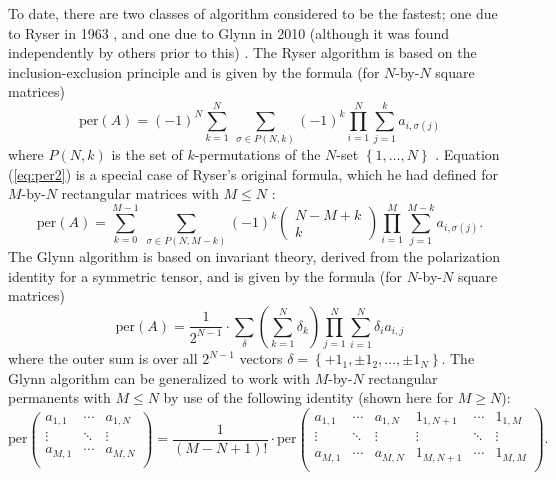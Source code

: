 \documentclass{article}
\begin{document}
To date, there are two classes of algorithm considered to be the fastest; one
due to Ryser in 1963 \cite{ryser1963}, and one due to Glynn in 2010 (although it was found
independently by others prior to this) \cite{wiki:computing,glynn2010}.
The Ryser algorithm is based on the inclusion-exclusion principle and is given by the formula
(for $N$-by-$N$ square matrices)
\begin{equation} \label{eq:per2}
    \text{per}(A) = \left(-1\right)^N \sum_{k=1}^N{
        ~\sum_{\sigma \in P(N,k)}{
            {\left(-1\right)}^{k}
            \prod_{i=1}^N{
                \sum_{j=1}^{k}{a_{i,{\sigma(j)}}}
            }
        }
    }
\end{equation}
where $P(N,k)$ is the set of $k$-permutations of the $N$-set $\left\{1,\dots,N\right\}$
\cite{wiki:permanent}.  Equation (\ref{eq:per2}) is a special case of Ryser's original formula,
which he had defined for $M$-by-$N$ rectangular matrices with $M \leq N$ \cite{ryser1963}:
\begin{equation} \label{eq:rectper2}
    \text{per}(A) = \sum_{k=0}^{M-1}{
        ~\sum_{\sigma \in P(N,M-k)}{
            {\left(-1\right)}^k \left(\begin{matrix}N - M + k\\ k\end{matrix}\right)
            \prod_{i=1}^M{
                \sum_{j=1}^{M-k}{a_{i,{\sigma(j)}}}
            }
        }
    }.
\end{equation}
The Glynn algorithm is based on invariant theory, derived from the polarization identity for
a symmetric tensor, and is given by the formula (for $N$-by-$N$ square matrices)
\begin{equation} \label{eq:per3}
    \text{per}(A) = \frac{1}{2^{N-1}} \cdot \sum_{\delta}{
        \left(\sum_{k=1}^N{\delta_k}\right)
        \prod_{j=1}^N{\sum_{i=1}^N{\delta_i a_{i,j}}}
    }
\end{equation}
where the outer sum is over all $2^{N-1}$ vectors $\delta = \left\{{+} 1_1,\pm 1_2,\dots,\pm 1_N\right\}$.
The Glynn algorithm can be generalized to work with $M$-by-$N$ rectangular permanents with
$M \leq N$ by use of the following identity (shown here for $M \geq N$):
\begin{equation} \label{eq:padidentity}
    {\text{per}}\left(
        \begin{matrix}
            a_{1,1} & \cdots & a_{1,N} \\
            \vdots & \ddots & \vdots \\
            a_{M,1} & \cdots & a_{M,N} \\
        \end{matrix}
    \right)
    = \frac{1}{\left(M - N + 1\right)!} \cdot {\text{per}}\left(
        \begin{matrix}
            a_{1,1} & \cdots & a_{1,N} & 1_{1,N+1} & \cdots & 1_{1,M} \\
            \vdots & \ddots & \vdots & \vdots & \ddots & \vdots \\
            a_{M,1} & \cdots & a_{M,N} & 1_{M,N+1} & \cdots & 1_{M,M} \\
        \end{matrix}
    \right).
\end{equation}
\end{document}
